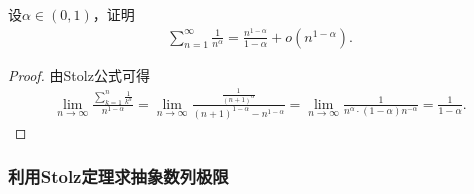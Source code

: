 \documentclass[../../main.tex]{subfiles}
\begin{document}
\begin{proposition}\label{proposition:幂次小于1的级数的阶}
设$\alpha \in \left( 0,1 \right)$，证明
\begin{align*}
\sum_{n=1}^{\infty}{\frac{1}{n^{\alpha}}}=\frac{n^{1-\alpha}}{1-\alpha}+o\left( n^{1-\alpha} \right) .
\end{align*}
\end{proposition}
\begin{proof}
由Stolz公式可得
\begin{align*}
\lim_{n\rightarrow \infty} \frac{\sum\limits_{k=1}^n{\frac{1}{k^{\alpha}}}}{n^{1-\alpha}}=\lim_{n\rightarrow \infty} \frac{\frac{1}{\left( n+1 \right) ^{\alpha}}}{\left( n+1 \right) ^{1-\alpha}-n^{1-\alpha}}=\lim_{n\rightarrow \infty} \frac{1}{n^{\alpha}\cdot \left( 1-\alpha \right) n^{-\alpha}}=\frac{1}{1-\alpha}.
\end{align*}
\end{proof}



\subsubsection{利用Stolz定理求抽象数列极限}
\end{document}
